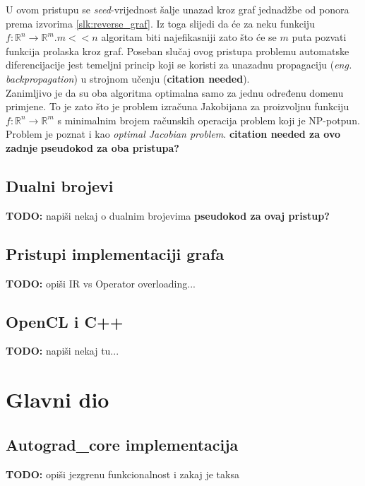 \documentclass[zavrsnirad]{fer}
\begin{document}
U ovom pristupu se \textit{seed}-vrijednost šalje unazad kroz graf jednadžbe od ponora prema izvorima \ref{slk:reverse_graf}. Iz toga slijedi da će za neku funkciju $f: \mathbb{R}^n \rightarrow \mathbb{R}^m. m << n$ algoritam biti najefikasniji zato što će se $m$ puta pozvati funkcija prolaska kroz graf. Poseban slučaj ovog pristupa problemu automatske diferencijacije jest temeljni princip koji se koristi za unazadnu propagaciju (\textit{eng. backpropagation}) u strojnom učenju (\textbf{citation needed}).
\\
Zanimljivo je da su oba algoritma optimalna samo za jednu određenu domenu primjene. To je zato što je problem izračuna Jakobijana za proizvoljnu funkciju $f: \mathbb{R}^n \rightarrow \mathbb{R}^m$ s minimalnim brojem računskih operacija problem koji je NP-potpun. Problem je poznat i kao \textit{optimal Jacobian problem}.
\textbf{citation needed za ovo zadnje}
\textbf{pseudokod za oba pristupa?}

\section{Dualni brojevi}
\textbf{TODO:} napiši nekaj o dualnim brojevima
\textbf{pseudokod za ovaj pristup?}
\\
\blindtext

\section{Pristupi implementaciji grafa}
\textbf{TODO:} opiši IR vs Operator overloading...
\\
\blindtext

\section{OpenCL i C++}
\textbf{TODO:} napiši nekaj tu...
\\
\blindtext


\chapter{Glavni dio}
\label{pog:glavni_dio}

\section{Autograd\_core implementacija}
\textbf{TODO:} opiši jezgrenu funkcionalnost i zakaj je taksa
\blindtext
\end{document}
